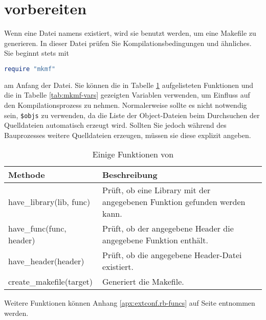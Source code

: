 \section{\protect{} vorbereiten}
\label{sec:extconf.rb}

Wenn eine Datei namens  existiert, wird sie benutzt
werden, um eine Makefile zu generieren. In dieser Datei prüfen Sie
Kompilationsbedingungen und ähnliches. Sie beginnt stets mit

\begin{lstlisting}[language=ruby]
require "mkmf"
\end{lstlisting}

\noindent am Anfang der Datei. Sie können \uA die in Tabelle
\ref{tab:mkmf-funcs} aufgelisteten Funktionen und die in Tabelle
\ref{tab:mkmf-vars} gezeigten Variablen verwenden, um Einfluss auf den
Kompilationsprozess zu nehmen. Normalerweise sollte es nicht notwendig
sein, \verb+$objs+ zu verwenden, da die Liste der Object-Dateien beim
Durchsuchen der Quelldateien automatisch erzeugt wird. Sollten Sie
jedoch während des Bauprozesses weitere Quelldateien erzeugen, müssen
sie diese explizit angeben.

\begin{table}[tbp]
  \centering
  \begin{tabularx}{\textwidth}{>{\ttfamily}lX}\raggedright
    \normalfont\bfseries Methode & \bfseries Beschreibung\\
    \hline
    have\_library(lib, func)     & Prüft, ob eine Library mit der angegebenen Funktion gefunden werden kann.\\
    have\_func(func, header)     & Prüft, ob der angegebene Header die angegebene Funktion enthält.\\
    have\_header(header)         & Prüft, ob die angegebene Header-Datei existiert.\\
    create\_makefile(target)     & Generiert die Makefile.\\
  \end{tabularx}

  \vspace{\baselineskip}

  \small Weitere Funktionen können Anhang \ref{apx:extconf.rb-funcs}
  auf Seite \pageref{apx:extconf.rb-funcs} entnommen werden.

  \caption{Einige Funktionen von }
  \label{tab:mkmf-funcs}
\end{table}

